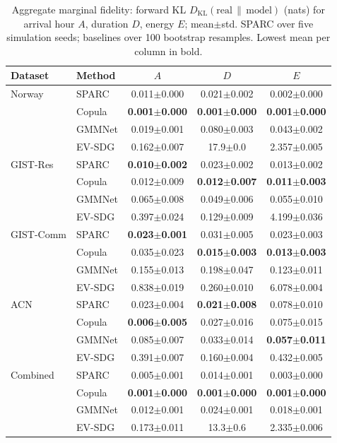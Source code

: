 \begin{table}[t]
\centering
\caption{Aggregate marginal fidelity: forward KL $D_{\mathrm{KL}}(\mathrm{real}\,\|\,\mathrm{model})$ (nats) for arrival hour $A$, duration $D$, energy $E$; mean$\pm$std. SPARC over five simulation seeds; baselines over 100 bootstrap resamples. Lowest mean per column in bold.}
\label{tab:benchmark}
\begin{tabular}{llccc}
\toprule
Dataset & Method & $A$ & $D$ & $E$ \\
\midrule
Norway & SPARC & 0.011$\pm$0.000 & 0.021$\pm$0.002 & 0.002$\pm$0.000 \\
 & Copula & \textbf{0.001$\pm$0.000} & \textbf{0.001$\pm$0.000} & \textbf{0.001$\pm$0.000} \\
 & GMMNet & 0.019$\pm$0.001 & 0.080$\pm$0.003 & 0.043$\pm$0.002 \\
 & EV-SDG & 0.162$\pm$0.007 & 17.9$\pm$0.0 & 2.357$\pm$0.005 \\
\midrule
GIST-Res & SPARC & \textbf{0.010$\pm$0.002} & 0.023$\pm$0.002 & 0.013$\pm$0.002 \\
 & Copula & 0.012$\pm$0.009 & \textbf{0.012$\pm$0.007} & \textbf{0.011$\pm$0.003} \\
 & GMMNet & 0.065$\pm$0.008 & 0.049$\pm$0.006 & 0.055$\pm$0.010 \\
 & EV-SDG & 0.397$\pm$0.024 & 0.129$\pm$0.009 & 4.199$\pm$0.036 \\
\midrule
GIST-Comm & SPARC & \textbf{0.023$\pm$0.001} & 0.031$\pm$0.005 & 0.023$\pm$0.003 \\
 & Copula & 0.035$\pm$0.023 & \textbf{0.015$\pm$0.003} & \textbf{0.013$\pm$0.003} \\
 & GMMNet & 0.155$\pm$0.013 & 0.198$\pm$0.047 & 0.123$\pm$0.011 \\
 & EV-SDG & 0.838$\pm$0.019 & 0.260$\pm$0.010 & 6.078$\pm$0.004 \\
\midrule
ACN & SPARC & 0.023$\pm$0.004 & \textbf{0.021$\pm$0.008} & 0.078$\pm$0.010 \\
 & Copula & \textbf{0.006$\pm$0.005} & 0.027$\pm$0.016 & 0.075$\pm$0.015 \\
 & GMMNet & 0.085$\pm$0.007 & 0.033$\pm$0.014 & \textbf{0.057$\pm$0.011} \\
 & EV-SDG & 0.391$\pm$0.007 & 0.160$\pm$0.004 & 0.432$\pm$0.005 \\
\midrule
Combined & SPARC & 0.005$\pm$0.001 & 0.014$\pm$0.001 & 0.003$\pm$0.000 \\
 & Copula & \textbf{0.001$\pm$0.000} & \textbf{0.001$\pm$0.000} & \textbf{0.001$\pm$0.000} \\
 & GMMNet & 0.012$\pm$0.001 & 0.024$\pm$0.001 & 0.018$\pm$0.001 \\
 & EV-SDG & 0.173$\pm$0.011 & 13.3$\pm$0.6 & 2.335$\pm$0.006 \\
\bottomrule
\end{tabular}
\end{table}